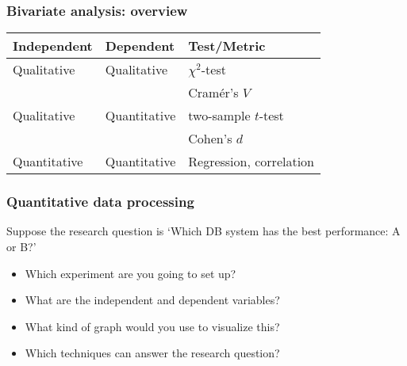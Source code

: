 \documentclass[aspectratio=169]{beamer}
\begin{document}
\begin{frame}
  \frametitle{Bivariate analysis: overview}
  \centering
  \begin{tabular}{lll}
    \toprule
    \textbf{Independent} & \textbf{Dependent} & \textbf{Test/Metric}    \\
    \midrule
    Qualitative          & Qualitative        & $\chi^2$-test           \\
                         &                    & Cramér's $V$            \\
    Qualitative          & Quantitative       & two-sample $t$-test     \\
                         &                    & Cohen's $d$             \\
    Quantitative         & Quantitative       & Regression, correlation \\
    \bottomrule
  \end{tabular}

  \bigskip

\end{frame}

\begin{frame}
  \frametitle{Quantitative data processing}

  Suppose the research question is `Which DB system has the best performance: A or B?'
  
  \begin{itemize}
      \item<+-> Which experiment are you going to set up?
      \item<+-> What are the independent and dependent variables?
      \item<+-> What kind of graph would you use to visualize this?
      \item<+-> Which techniques can answer the research question?
  \end{itemize}

 
\end{frame}
\end{document}
